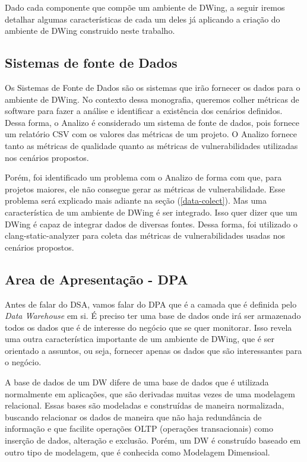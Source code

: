 Dado cada componente que compõe um ambiente de DWing, a seguir iremos detalhar algumas características de cada um deles já aplicando a criação do ambiente de DWing construido neste trabalho.

\subsection{Sistemas de fonte de Dados}

Os Sistemas de Fonte de Dados são os sistemas que irão fornecer os dados para o ambiente de DWing. No contexto dessa monografia, queremos colher métricas de software para fazer a análise e identificar a existência dos cenários definidos. Dessa forma, o Analizo é considerado um sistema de fonte de dados, pois fornece um relatório CSV com os valores das métricas de um projeto. O Analizo fornece tanto as métricas de qualidade quanto as métricas de vulnerabilidades utilizadas nos cenários propostos. 

Porém, foi identificado um problema com o Analizo de forma com que, para projetos maiores, ele não consegue gerar as métricas de vulnerabilidade. Esse problema será explicado mais adiante na seção (\ref{data-colect}). Mas uma característica de um ambiente de DWing é ser integrado. Isso quer dizer que um DWing é capaz de integrar dados de diversas fontes. Dessa forma, foi utilizado o clang-static-analyzer para coleta das métricas de vulnerabilidades usadas nos cenários propostos.


\subsection{Area de Apresentação - DPA}

Antes de falar do DSA, vamos falar do DPA que é a camada que é definida pelo \emph{Data Warehouse} em si. É preciso ter uma base de dados onde irá ser armazenado todos os dados que é de interesse do negócio que se quer monitorar. Isso revela uma outra característica importante de um ambiente de DWing, que é ser orientado a assuntos, ou seja, fornecer apenas os dados que são interessantes para o negócio.

A base de dados de um DW difere de uma base de dados que é utilizada normalmente em aplicações, que são derivadas muitas vezes de uma modelagem relacional. Essas bases são modeladas e construídas de maneira normalizada, buscando relacionar os dados de maneira que não haja redundância de informação e que facilite operações OLTP (operações transacionais) como inserção de dados, alteração e exclusão. Porém, um DW é construído baseado em outro tipo de modelagem, que é conhecida como Modelagem Dimensioal.

